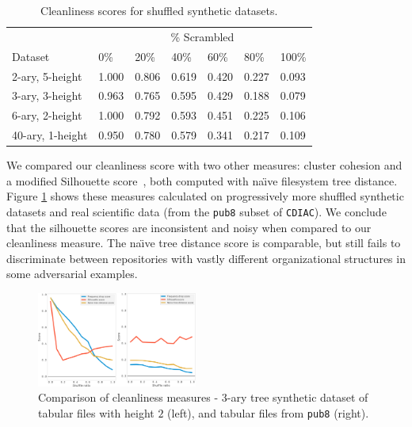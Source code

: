 \documentclass[sigconf,screen]{acmart}
\begin{document}
\begin {table}[!htbp]
\begin{center}
\begin{tabular}{@{}lllllll@{}}  %
\toprule
  & \multicolumn{6}{c}{\% Scrambled} \\
 Dataset & 0\% & 20\% & 40\% & 60\% & 80\% & 100\%\\
\midrule
 2-ary, \hspace{0.5mm} 5-height & 1.000 & 0.806 & 0.619 & 0.420 & 0.227 & 0.093\\ 
 3-ary, \hspace{0.5mm} 3-height & 0.963 & 0.765 & 0.595 & 0.429 & 0.188 & 0.079\\ 
 6-ary, \hspace{0.5mm} 2-height & 1.000 & 0.792 & 0.593 & 0.451 & 0.225 & 0.106\\ 
 40-ary, 1-height & 0.950 & 0.780 & 0.579 & 0.341 & 0.217 & 0.109\\ 
 \bottomrule
\end{tabular}
\caption{\label{synthetictable} Cleanliness scores for shuffled synthetic datasets.}
\end{center}
\vspace{-1.0cm}
\end{table}

We compared our cleanliness score with two other measures: cluster cohesion and a modified Silhouette score~\cite{silhouette}, both computed with na{\"{\i}}ve filesystem tree distance. 
Figure \ref{cleanlinessgraphs} shows these measures calculated on progressively more shuffled synthetic datasets and real scientific data (from the \texttt{pub8} subset of \texttt{CDIAC}). We conclude that the silhouette scores are inconsistent and noisy when compared to our cleanliness measure. The na{\"{\i}}ve tree distance score is comparable, but still fails to discriminate between repositories with vastly different organizational structures in some adversarial examples.

\begin{center}
\begin{figure}[!htbp]
\includegraphics[width=0.47\textwidth]{side-by-side_eval.png}
\setlength{\belowcaptionskip}{-20pt}
\caption{\label{cleanlinessgraphs} Comparison of cleanliness measures - \textmd{$3$-ary tree synthetic dataset of tabular files with height $2$ (left), and tabular files from \texttt{pub8} (right). }}
\end{figure}
\end{center}
\end{document}
